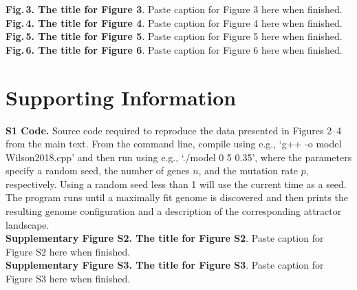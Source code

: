 \documentclass[10pt,letterpaper]{article}
\begin{document}
\noindent\textbf{Fig.\,3. The title for Figure 3}. Paste caption for Figure 3 here when finished.
\vspace{1em}\\

\noindent\textbf{Fig.\,4. The title for Figure 4}. Paste caption for Figure 4 here when finished.
\vspace{1em}\\

\noindent\textbf{Fig.\,5. The title for Figure 5}. Paste caption for Figure 5 here when finished.
\vspace{1em}\\

\noindent\textbf{Fig.\,6. The title for Figure 6}. Paste caption for Figure 6 here when finished.
\vspace{1em}\\


\section*{Supporting Information}

\noindent\textbf{S1 Code.} Source code required to reproduce the data presented in Figures 2--4 from the main text. From the command line, compile using e.g., `g++ -o model Wilson2018.cpp' and then run using e.g., `./model 0 5 0.35', where the parameters specify a random seed, the number of genes $n$, and the mutation rate $p$, respectively. Using a random seed less than 1 will use the current time as a seed. The program runs until a maximally fit genome is discovered and then prints the resulting genome configuration and a description of the corresponding attractor landscape.\\


\noindent\textbf{Supplementary Figure S2. The title for Figure S2}. Paste caption for Figure S2 here when finished.
\vspace{1em}\\

\noindent\textbf{Supplementary Figure S3. The title for Figure S3}. Paste caption for Figure S3 here when finished.
\vspace{1em}\\
\end{document}
